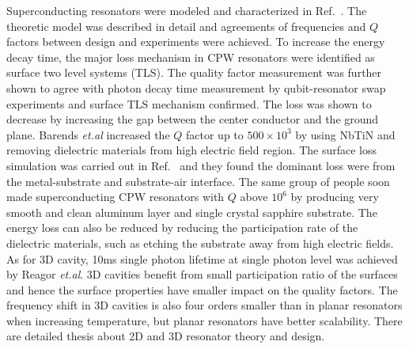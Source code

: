 \documentclass[%
groupedaddress,
showpacs,
 amsmath,amssymb,
 aps,
prb,
]{revtex4-1}
\newcommand{\etal}{\textit{et.al}}
\begin{document}
Superconducting resonators were modeled and characterized in Ref.~. The theoretic model was described in detail and agreements of frequencies and $Q$ factors between design and experiments were achieved. To increase the energy decay time, the major loss mechanism in CPW resonators were identified as surface two level systems (TLS)\cite{Gao2008Exp}. The quality factor measurement was further shown to agree with photon decay time  measurement by qubit-resonator swap experiments and surface TLS mechanism confirmed\cite{Wang2009}. The loss was shown to decrease by increasing the gap between the center conductor and the ground plane. Barends \etal{} increased the $Q$ factor up to $500\times 10^3$ by using NbTiN and removing dielectric materials from high electric field region\cite{Barends2010APL}. The surface loss simulation was carried out in Ref.~ and they found the dominant loss were from the metal-substrate and substrate-air interface. The same group of people soon made superconducting CPW resonators with $Q$ above $10^6$ by producing very smooth and clean aluminum layer and single crystal sapphire substrate\cite{Megrant2012}. The energy loss can also be reduced by reducing the participation rate of the dielectric materials, such as etching the substrate away from high electric fields\cite{Bruno2015}. As for 3D cavity, 10ms single photon lifetime at single photon level was achieved by Reagor \etal{}\cite{Reagor2013}. 3D cavities benefit from small participation ratio of the surfaces and hence the surface properties have smaller impact on the quality factors. The frequency shift in 3D cavities is also four orders smaller than in planar resonators when increasing temperature, but planar resonators have better scalability. There are detailed thesis about 2D\cite{Geerlings2013} and 3D\cite{Reagor2015thesis} resonator theory and design.
\end{document}
